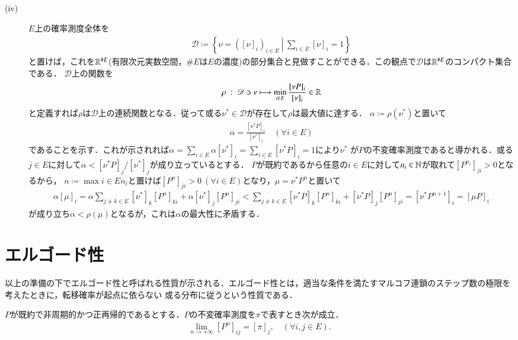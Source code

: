 \begin{prf}
\begin{description}
			\item[\rm{(iv)}]
				$E$上の確率測度全体を
				\begin{align}
					\mathscr{D} \coloneqq \left\{ \nu=([\nu]_i)_{i \in E}\ \left|\ \sum_{i \in E}[\nu]_i = 1 \right.\right\}
				\end{align}
				と置けば，これを$\mathbb{R}^{\# E}$(有限次元実数空間，$\# E$は$E$の濃度)の部分集合と見做すことができる．この観点で$\mathscr{D}$は$\mathbb{R}^{\# E}$のコンパクト集合である．
				$\mathscr{D}$上の関数を
				\begin{align}
					\rho\ :\ \mathscr{D} \ni \nu \longmapsto \operatorname*{min}_{i \in E} \frac{[\nu P]_i}{[\nu]_i} \in \mathbb{R}
				\end{align}
				と定義すれば$\rho$は$\mathscr{D}$上の連続関数となる．従って或る$\nu^* \in \mathscr{D}$が存在して$\rho$は最大値に達する．
				$\alpha \coloneqq \rho(\nu^*)$と置いて
				\begin{align}
					\alpha = \frac{[\nu^* P]_i}{[\nu^*]_i}\quad (\forall i \in E)
				\end{align}
				であることを示す．これが示されれば$\alpha = \sum_{i \in E} \alpha [\nu^*]_i = \sum_{i \in E} [\nu^* P]_i = 1$により$\nu^*$
				が$P$の不変確率測度であると導かれる．或る$j \in E$に対して$\alpha < [\nu^* P]_j/[\nu^*]_j$が成り立っているとする．
				$P$が既約であるから任意の$i \in E$に対して$n_i \in \mathbb{N}$が取れて$[P^{n_i}]_{ji} > 0$となるから，
				$n \coloneqq \max{i \in E}{n_i}$と置けば$[P^n]_{ji} > 0\ (\forall i \in E)$となり，$\mu = \nu^* P^n$と置いて
				\begin{align}
					\alpha [\mu]_i = \alpha \sum_{j \neq k \in E} [\nu^*]_k [P^{n}]_{ki} + \alpha [\nu^*]_j [P^{n}]_{ji} 
					< \sum_{j \neq k \in E} [\nu^* P]_{k} [P^{n}]_{ki} + [\nu^* P]_j [P^{n}]_{ji} = [\nu^* P^{n + 1}]_i = [\mu P]_i
				\end{align}
				が成り立ち$\alpha < \rho(\mu)$となるが，これは$\alpha$の最大性に矛盾する．
		\end{description}
	\end{prf}

\section{エルゴード性}
	\label{sec:ergodic}
	以上の準備の下でエルゴード性と呼ばれる性質が示される．エルゴード性とは，適当な条件を満たすマルコフ連鎖のステップ数の極限を考えたときに，転移確率が起点に依らない
	或る分布に従うという性質である．
	
	\begin{thm}[エルゴード性]
		$P$が既約で非周期的かつ正再帰的であるとする．$P$の不変確率測度を$\pi$で表すとき次が成立．
		\begin{align}
			\lim_{n \to +\infty}[P^n]_{ij} = [\pi]_j, \quad (\forall i,j \in E).
		\end{align}
	\end{thm}
	
